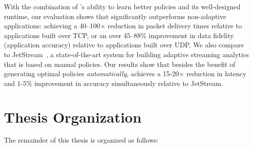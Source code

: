 \documentclass[thesis.tex]{subfiles}
\begin{document}
With the combination of \awstream{}'s ability to learn better policies and its
well-designed runtime, our evaluation shows that \awstream{} significantly
outperforms non-adaptive applications: achieving a 40--100$\times$ reduction in
packet delivery times relative to applications built over TCP, or an over
45--88\% improvement in data fidelity (application accuracy) relative to
applications built over UDP. We also compare \awstream{} to
JetStream~\cite{rabkin2014aggregation}, a state-of-the-art system for building
adaptive streaming analytics that is based on manual policies. Our results show
that besides the benefit of generating optimal policies \textit{automatically},
\awstream{} achieves a 15-20$\times$ reduction in latency and 1-5\% improvement
in accuracy simultaneously relative to JetStream.

\section{Thesis Organization}
\label{sec:thesis-organization}

The remainder of this thesis is organized as follows:
\end{document}
